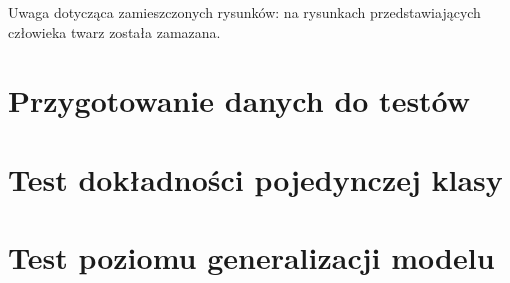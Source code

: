 Uwaga dotycząca zamieszczonych rysunków: na rysunkach przedstawiających człowieka twarz została zamazana.


\section{Przygotowanie danych do testów}
\label{sec:test-wspoldzielony}


\section{Test dokładności pojedynczej klasy}
\label{sec:test-1}


\section{Test poziomu generalizacji modelu}
\label{sec:test-2}


